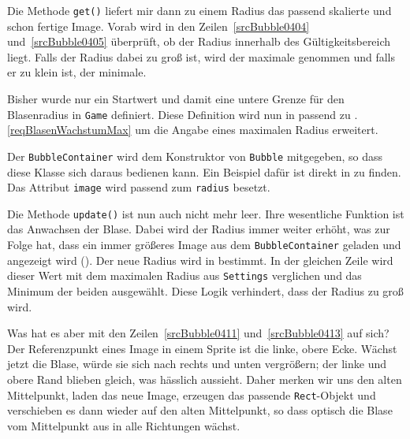 Die Methode \texttt{get()} liefert mir dann zu einem Radius das passend skalierte und schon fertige Image. Vorab wird in den Zeilen~\ref{srcBubble0404} und~\ref{srcBubble0405} überprüft, ob der Radius innerhalb des Gültigkeitsbereich liegt. Falls der Radius dabei zu groß ist, wird der maximale genommen und falls er zu klein ist, der minimale.


Bisher wurde nur ein Startwert und damit eine untere Grenze für den Blasenradius in \texttt{Game} definiert. Diese Definition wird nun in  passend zu .\ref{reqBlasenWachstumMax} um die Angabe eines maximalen Radius erweitert.


Der \texttt{BubbleContainer} wird dem Konstruktor von \texttt{Bubble} mitgegeben, so dass diese Klasse sich daraus bedienen kann. Ein Beispiel dafür ist direkt in  zu finden. Das Attribut \texttt{image} wird passend zum \texttt{radius} besetzt.

Die Methode \texttt{update()} ist nun auch nicht mehr leer. Ihre wesentliche Funktion ist das Anwachsen der Blase. Dabei wird der Radius immer weiter erhöht, was zur Folge hat, dass ein immer größeres Image aus dem \texttt{BubbleContainer} geladen und angezeigt wird (). Der neue Radius wird in  bestimmt. In der gleichen Zeile wird dieser Wert mit dem maximalen Radius aus \texttt{Settings} verglichen und das Minimum der beiden ausgewählt. Diese Logik verhindert, dass der Radius zu groß wird.

Was hat es aber mit den Zeilen~\ref{srcBubble0411} und~\ref{srcBubble0413} auf sich? Der Referenzpunkt eines Image in einem Sprite ist die linke, obere Ecke. Wächst jetzt die Blase, würde sie sich nach rechts und unten vergrößern; der linke und obere Rand blieben gleich, was hässlich aussieht. Daher merken wir uns den alten Mittelpunkt, laden das neue Image, erzeugen das passende \texttt{Rect}-Objekt und verschieben es dann wieder auf den alten Mittelpunkt, so dass optisch die Blase vom Mittelpunkt aus in alle Richtungen wächst.

